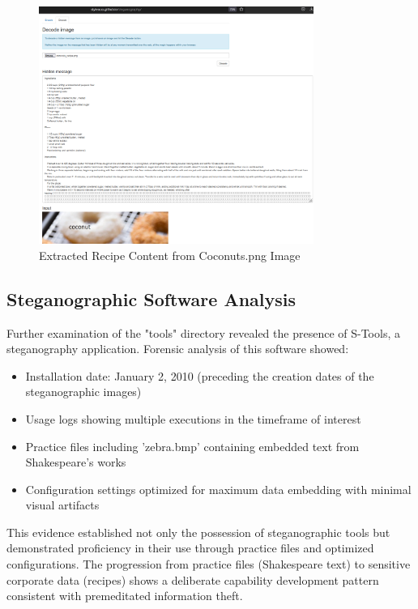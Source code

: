 \begin{figure}[h]
    \centering
    \includegraphics[width=0.8\textwidth]{images/Artifact and Evidence Recovery/coconuts_extract.png}
    \caption{Extracted Recipe Content from Coconuts.png Image}
    \label{fig:coconuts_recipe}
\end{figure}

\subsection{Steganographic Software Analysis}
Further examination of the "tools" directory revealed the presence of S-Tools, a steganography application. Forensic analysis of this software showed:

\begin{itemize}
    \item Installation date: January 2, 2010 (preceding the creation dates of the steganographic images)
    \item Usage logs showing multiple executions in the timeframe of interest
    \item Practice files including 'zebra.bmp' containing embedded text from Shakespeare's works
    \item Configuration settings optimized for maximum data embedding with minimal visual artifacts
\end{itemize}

This evidence established not only the possession of steganographic tools but demonstrated proficiency in their use through practice files and optimized configurations. The progression from practice files (Shakespeare text) to sensitive corporate data (recipes) shows a deliberate capability development pattern consistent with premeditated information theft.

